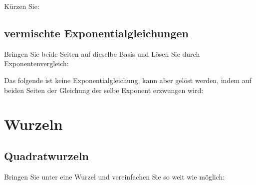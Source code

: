 
\noTRAINER{\newpage}
\newpage
Kürzen Sie:


\newpage
\subsection{vermischte Exponentialgleichungen}
Bringen Sie beide Seiten auf dieselbe Basis und Lösen Sie durch
Exponentenvergleich:

\noTRAINER{\newpage}


Das folgende ist keine Exponentialgleichung, kann aber gelöst werden,
indem auf beiden Seiten der Gleichung der selbe Exponent erzwungen
wird:


\newpage
\section{Wurzeln}
\subsection{Quadratwurzeln}



\noTRAINER{\newpage}



Bringen Sie unter eine Wurzel und vereinfachen Sie so weit wie
möglich:




